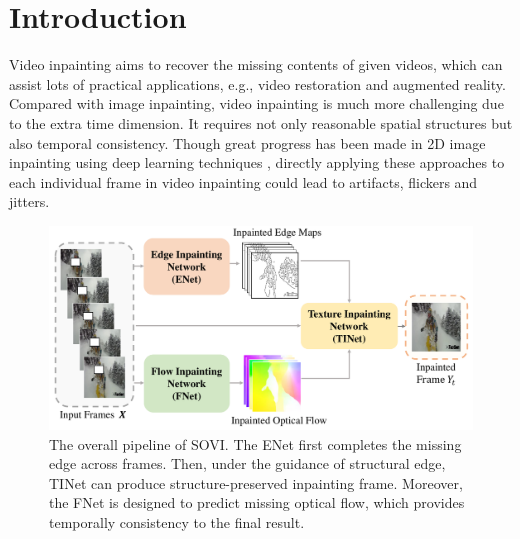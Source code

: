 

\section{Introduction}


Video inpainting aims to recover the missing contents of given videos, which can assist lots of practical applications, e.g., video restoration and augmented reality. Compared with image inpainting, video inpainting is much more challenging due to the extra time dimension. It requires not only reasonable spatial structures but also temporal consistency. 
Though great progress has been made in 2D image inpainting using deep learning techniques \cite{yu2018free,Xiong_2019_CVPR}, directly applying these approaches to each individual frame in video inpainting could lead to artifacts, flickers and jitters. 

\begin{figure}[t]
	\centering
	\includegraphics[width=1.0\columnwidth]{zong} %
	\caption{The overall pipeline of SOVI. The ENet first completes the missing edge across frames. Then, under the guidance of structural edge, TINet can produce structure-preserved inpainting frame. Moreover, the FNet is designed to predict missing optical flow, which provides temporally consistency to the final result.}
	\label{zong}
\end{figure}


